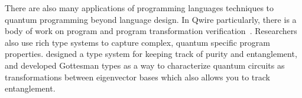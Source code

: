 There are also many applications of programming languages techniques to quantum programming beyond language design.
In Qwire particularly, there is a body of work on program and program transformation verification~\cite{qwirepractice}.
Researchers also use rich type systems to capture complex, quantum specific program properties.
\citet{twist} designed a type system for keeping track of purity and entanglement, and \citet{gottesmanex} developed Gottesman types as a way to characterize quantum circuits as transformations between eigenvector bases which also allows you to track entanglement.


